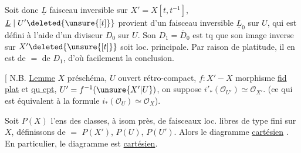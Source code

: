  Soit donc $\underline L$ faisceau inversible sur $X'=X[t,t^{-1}]$,   $\underline L\mid U'\deleted{\unsure{[t]}}$ provient d'un faisceau inversible $\underline L_0$ sur $U$, qui est défini à l'aide d'un diviseur $D_0$ sur $U$. Son  $D_1=\overline{D}_0$ est tq que son image inverse sur $X'\deleted{\unsure{[t]}}$  soit loc. principale. Par raison de platitude, il en est de $=$ de $D_1$, d'où facilement la conclusion.

[ N.B. \uline{Lemme} $X$ préschéma, $U$ ouvert rétro-compact, $f:X'\mathbin{-}X$ morphisme \uline{fid plat} et \uline{qu cpt}, $U'=f^{-1}(\unsure{X'|U})$, on suppose $\boxed{i'_*(\mathcal O_{U'})\simeq\mathcal O_{X'}}$. (ce qui est équivalent à la formule $\boxed{i_*(\mathcal O_U)\simeq\mathcal O_X}$).


Soit $P(X)$ l'ens des classes, à isom près, de faisceaux loc. libres de type fini sur $X$, définissons de $=$ $P(X')$, $P(U)$, $P(U')$. Alors le diagramme
 \uline{cartésien} . En particulier, le diagramme
est \uline{cartésien}.


